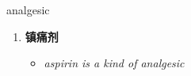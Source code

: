 
\begin{frame}
{\huge analgesic}
\begin{center}
\begin{enumerate}\Large
  \item \textbf{镇痛剂}
  \begin{itemize}
    \item \em{\Large{aspirin is a kind of analgesic}}
  \end{itemize}
\end{enumerate}
\end{center}
\end{frame}
